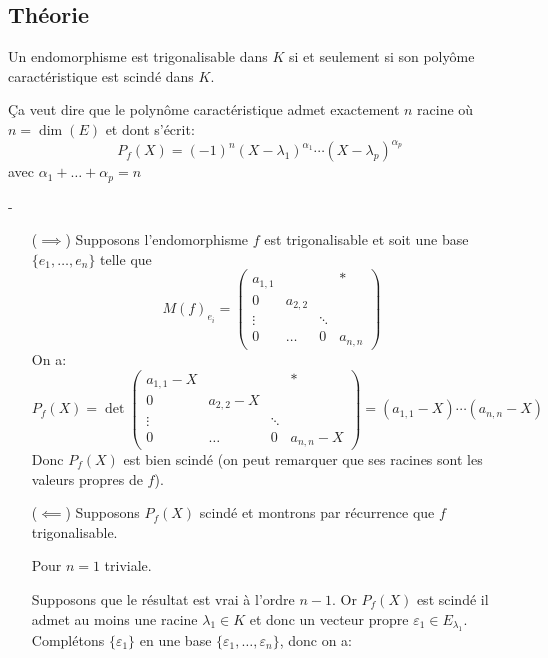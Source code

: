 \subsection{Théorie}
\begin{theorem}\label{thm:trigonalisable-si-scinde}
    Un endomorphisme est trigonalisable dans $K$ si et seulement si son polyôme caractéristique est scindé dans  $K$. 
    \par 
    Ça veut dire que le polynôme caractéristique admet exactement $n$ racine où  $n = \dim(E)$ et dont s'écrit:
     \[
         P_f(X) = (-1)^n(X - \lambda_1)^{\alpha_1}\cdots(X - \lambda_p)^{\alpha_p}
    \] 
    avec $\alpha_1 + \ldots + \alpha_p = n$
\end{theorem}
\begin{preuve} -
   \begin{itemize}
       \item[($\implies$)] Supposons l'endomorphisme $f$ est trigonalisable et soit une base  $\{e_1, \ldots, e_n\}$ telle que
           \[
               M(f)_{e_i} = \begin{pmatrix} 
                   a_{1,1} &            & & *\\
                   0       & a_{2, 2}   & & \\
                   \vdots  &      & \ddots & \\
                   0        & \ldots    & 0 & a_{n, n}
               \end{pmatrix} 
           \] 
           On a:
           \[
            P_f(X) = \det \begin{pmatrix} 
                   a_{1,1} - X &            & & *\\
                   0       & a_{2, 2} - X   & & \\
                   \vdots  &      & \ddots & \\
                   0        & \ldots    & 0 & a_{n, n} - X
               \end{pmatrix} = (a_{1,1} - X) \cdots (a_{n,n} - X)
           \] 
           Donc $P_f(X)$ est bien scindé (on peut remarquer que ses racines sont les valeurs propres de $f$).
       \item[($\impliedby$)] Supposons $P_f(X)$ scindé et montrons par récurrence que  $f$ trigonalisable.
            \par
            Pour  $n=1$ triviale.
            \par
            Supposons que le résultat est vrai à l'ordre  $n-1$. Or  $P_f(X)$ est scindé il admet au moins une racine  $\lambda_1 \in K$ et donc un vecteur propre $\varepsilon_1 \in E_{\lambda_1}$. Complétons $\{\varepsilon_1\}$ en une base $\{\varepsilon_1, \ldots, \varepsilon_n\}$, donc on a:

\end{itemize}
\end{preuve}
